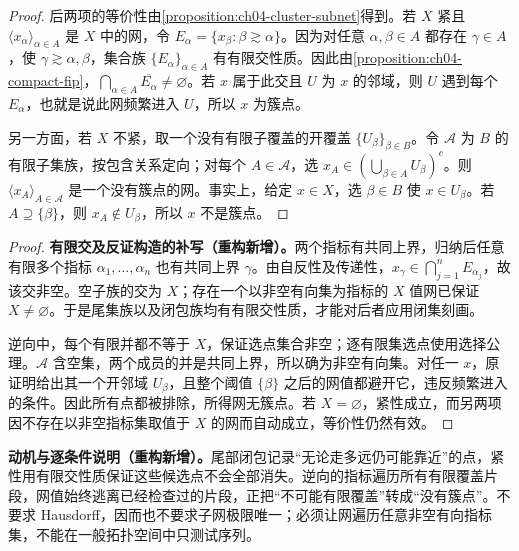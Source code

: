 \documentclass[../../main.tex]{subfiles}%
\begin{document}
\begin{proof}
后两项的等价性由\cref{proposition:ch04-cluster-subnet}得到。若 $X$ 紧且 $\langle x_\alpha\rangle_{\alpha\in A}$ 是 $X$ 中的网，令 $E_\alpha=\{x_\beta:\beta\gtrsim\alpha\}$。因为对任意 $\alpha,\beta\in A$ 都存在 $\gamma\in A$，使 $\gamma\gtrsim\alpha,\beta$，集合族 $\{E_\alpha\}_{\alpha\in A}$ 有有限交性质。因此由\cref{proposition:ch04-compact-fip}，$\bigcap_{\alpha\in A}\overline{E_\alpha}\ne\varnothing$。若 $x$ 属于此交且 $U$ 为 $x$ 的邻域，则 $U$ 遇到每个 $E_\alpha$，也就是说此网频繁进入 $U$，所以 $x$ 为簇点。

另一方面，若 $X$ 不紧，取一个没有有限子覆盖的开覆盖 $\{U_\beta\}_{\beta\in B}$。令 $\mathcal A$ 为 $B$ 的有限子集族，按包含关系定向；对每个 $A\in\mathcal A$，选 $x_A\in(\bigcup_{\beta\in A}U_\beta)^c$。则 $\langle x_A\rangle_{A\in\mathcal A}$ 是一个没有簇点的网。事实上，给定 $x\in X$，选 $\beta\in B$ 使 $x\in U_\beta$。若 $A\supseteq\{\beta\}$，则 $x_A\notin U_\beta$，所以 $x$ 不是簇点。
\end{proof}
\begin{proof}
\textbf{有限交及反证构造的补写（重构新增）。}两个指标有共同上界，归纳后任意有限多个指标 $\alpha_1,\ldots,\alpha_n$ 也有共同上界 $\gamma$。由自反性及传递性，$x_\gamma\in\bigcap_{j=1}^nE_{\alpha_j}$，故该交非空。空子族的交为 $X$；存在一个以非空有向集为指标的 $X$ 值网已保证 $X\ne\varnothing$。于是尾集族以及闭包族均有有限交性质，才能对后者应用闭集刻画。

逆向中，每个有限并都不等于 $X$，保证选点集合非空；逐有限集选点使用选择公理。$\mathcal A$ 含空集，两个成员的并是共同上界，所以确为非空有向集。对任一 $x$，原证明给出其一个开邻域 $U_\beta$，且整个阈值 $\{\beta\}$ 之后的网值都避开它，违反频繁进入的条件。因此所有点都被排除，所得网无簇点。若 $X=\varnothing$，紧性成立，而另两项因不存在以非空指标集取值于 $X$ 的网而自动成立，等价性仍然有效。
\end{proof}
\begin{remark}
\textbf{动机与逐条件说明（重构新增）。}尾部闭包记录“无论走多远仍可能靠近”的点，紧性用有限交性质保证这些候选点不会全部消失。逆向的指标遍历所有有限覆盖片段，网值始终逃离已经检查过的片段，正把“不可能有限覆盖”转成“没有簇点”。不要求 Hausdorff，因而也不要求子网极限唯一；必须让网遍历任意非空有向指标集，不能在一般拓扑空间中只测试序列。
\end{remark}
\end{document}
